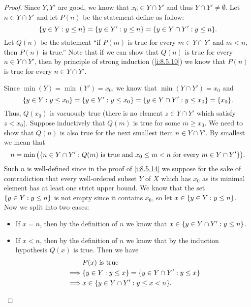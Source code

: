\begin{proof}
  Since \(Y, Y'\) are good, we know that \(x_0 \in Y \cap Y'\) and thus \(Y \cap Y' \neq \emptyset\).
  Let \(n \in Y \cap Y'\) and let \(P(n)\) be the statement define as follow:
  \[
    \set{y \in Y : y \leq n} = \set{y \in Y' : y \leq n} = \set{y \in Y \cap Y' : y \leq n}.
  \]
  Let \(Q(n)\) be the statement ``if \(P(m)\) is true for every \(m \in Y \cap Y'\) and \(m < n\), then \(P(n)\) is true.''
  Note that if we can show that \(Q(n)\) is true for every \(n \in Y \cap Y'\), then by principle of strong induction (\cref{i:8.5.10}) we know that \(P(n)\) is true for every \(n \in Y \cap Y'\).

  Since \(\min(Y) = \min(Y') = x_0\), we know that \(\min(Y \cap Y') = x_0\) and
  \[
    \set{y \in Y : y \leq x_0} = \set{y \in Y' : y \leq x_0} = \set{y \in Y \cap Y' : y \leq x_0} = \set{x_0}.
  \]
  Thus, \(Q(x_0)\) is vacuously true (there is no element \(z \in Y \cap Y'\) which satisfy \(z < x_0\)).
  Suppose inductively that \(Q(m)\) is true for some \(m \geq x_0\).
  We need to show that \(Q(n)\) is also true for the next smallest item \(n \in Y \cap Y'\).
  By smallest we mean that
  \[
    n = \min\big(\set{n \in Y \cap Y' : Q(m) \text{ is true and } x_0 \leq m < n \text { for every } m \in Y \cap Y'}\big).
  \]
  Such \(n\) is well-defined since in the proof of \cref{i:8.5.14} we suppose for the sake of contradiction that every well-ordered subset \(Y\) of \(X\) which has \(x_0\) as its minimal element has at least one strict upper bound.
  We know that the set \(\left\lbrace y \in Y : y \leq n\right\rbrace\) is not empty since it contains \(x_0\), so let \(x \in \left\lbrace y \in Y : y \leq n\right\rbrace\).
  Now we split into two cases:
  \begin{itemize}
    \item If \(x = n\), then by the definition of \(n\) we know that \(x \in \left\lbrace y \in Y \cap Y' : y \leq n\right\rbrace\).
    \item If \(x < n\), then by the definition of \(n\) we know that by the induction hypothesis \(Q(x)\) is true.
          Then we have
          \begin{align*}
                     & P(x) \text{ is true}                                        \\
            \implies & \set{y \in Y : y \leq x} = \set{y \in Y \cap Y' : y \leq x} \\
            \implies & x \in \set{y \in Y \cap Y' : y \leq x < n}.
          \end{align*}
  \end{itemize}

\end{proof}
